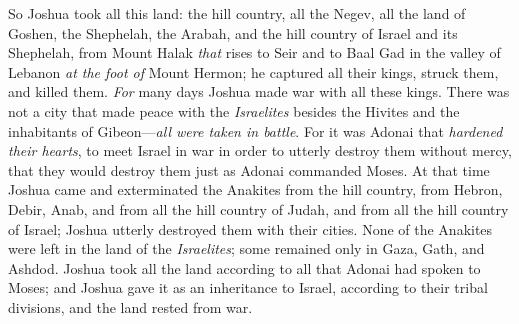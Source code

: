 \begin{biblechapter}
 So Joshua took all this land: the hill country, all the Negev, all the land of Goshen, the Shephelah, the Arabah, and the hill country of Israel and its Shephelah,
\verse from Mount Halak \textit{that} rises to Seir and to Baal Gad in the valley of Lebanon \textit{at the foot of} Mount Hermon; he captured all their kings, struck them, and killed them.
\verse \textit{For} many days Joshua made war with all these kings.
\verse There was not a city that made peace with the \textit{Israelites} besides the Hivites and the inhabitants of Gibeon—\textit{all were taken in battle}.
\verse For it was Adonai that \textit{hardened their hearts}, to meet Israel in war in order to utterly destroy them without mercy, that they would destroy them just as Adonai commanded Moses.
\verse At that time Joshua came and exterminated the Anakites from the hill country, from Hebron, Debir, Anab, and from all the hill country of Judah, and from all the hill country of Israel; Joshua utterly destroyed them with their cities.
\verse None of the Anakites were left in the land of the \textit{Israelites}; some remained only in Gaza, Gath, and Ashdod.
\verse Joshua took all the land according to all that Adonai had spoken to Moses; and Joshua gave it as an inheritance to Israel, according to their tribal divisions, and the land rested from war.
\end{biblechapter}


